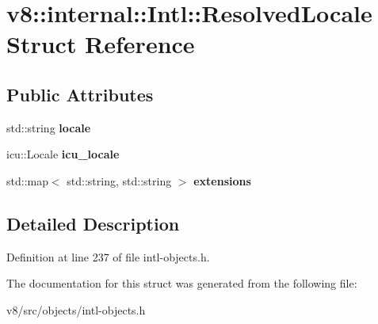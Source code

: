 \hypertarget{structv8_1_1internal_1_1Intl_1_1ResolvedLocale}{}\section{v8\+:\+:internal\+:\+:Intl\+:\+:Resolved\+Locale Struct Reference}
\label{structv8_1_1internal_1_1Intl_1_1ResolvedLocale}
\subsection*{Public Attributes}
\begin{DoxyCompactItemize}
\item 
\mbox{\label{structv8_1_1internal_1_1Intl_1_1ResolvedLocale_aaa925a84d8c7f05e9389e3ce4e90a8ef}} 
std\+::string {\bfseries locale}
\item 
\mbox{\label{structv8_1_1internal_1_1Intl_1_1ResolvedLocale_a175dcfe7e1d6bb277c83221a29d51f8a}} 
icu\+::\+Locale {\bfseries icu\+\_\+locale}
\item 
\mbox{\label{structv8_1_1internal_1_1Intl_1_1ResolvedLocale_a704c4a0d626810ef07f11e71e25a47b6}} 
std\+::map$<$ std\+::string, std\+::string $>$ {\bfseries extensions}
\end{DoxyCompactItemize}


\subsection{Detailed Description}


Definition at line 237 of file intl-\/objects.\+h.



The documentation for this struct was generated from the following file\+:\begin{DoxyCompactItemize}
\item 
v8/src/objects/intl-\/objects.\+h\end{DoxyCompactItemize}
